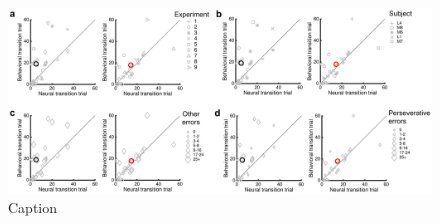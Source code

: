 \begin{figure}[htbp]

\begin{center}
\includegraphics[width=\textwidth]{Figures/NN_figS6.jpg} 
\end{center}

\caption[Relationship between task parameters and neural/behavioral transitions]
{Caption}

\label{fig:NN_figS6}
\end{figure}